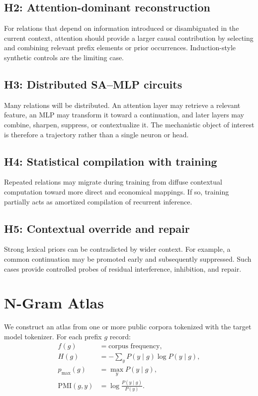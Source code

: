 \documentclass[10pt]{article}
\begin{document}
\subsection{H2: Attention-dominant reconstruction}
For relations that depend on information introduced or disambiguated in the current context, attention should provide a larger causal contribution by selecting and combining relevant prefix elements or prior occurrences. Induction-style synthetic controls are the limiting case.

\subsection{H3: Distributed SA--MLP circuits}
Many relations will be distributed. An attention layer may retrieve a relevant feature, an MLP may transform it toward a continuation, and later layers may combine, sharpen, suppress, or contextualize it. The mechanistic object of interest is therefore a trajectory rather than a single neuron or head.

\subsection{H4: Statistical compilation with training}
Repeated relations may migrate during training from diffuse contextual computation toward more direct and economical mappings. If so, training partially acts as amortized compilation of recurrent inference.

\subsection{H5: Contextual override and repair}
Strong lexical priors can be contradicted by wider context. For example, a common continuation may be promoted early and subsequently suppressed. Such cases provide controlled probes of residual interference, inhibition, and repair.

\section{N-Gram Atlas}
We construct an atlas from one or more public corpora tokenized with the target model tokenizer. For each prefix $g$ record:
\begin{align}
 f(g) &= \text{corpus frequency},\\
 H(g) &= -\sum_y P(y\mid g)\log P(y\mid g),\\
 p_{\max}(g) &= \max_y P(y\mid g),\\
 \mathrm{PMI}(g,y) &= \log \frac{P(y\mid g)}{P(y)}.
\end{align}
\end{document}
